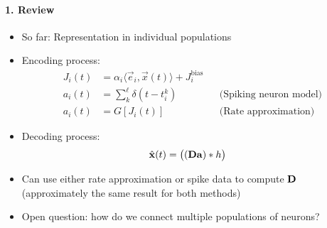 \documentclass[10pt,letterpaper,oneside]{article}
\begin{document}
\paragraph{1. Review}
\begin{itemize}
	\item So far: Representation in individual populations
	\item Encoding process:
	\begin{align*}
		J_i(t) &= \alpha_i \langle \vec e_i, \vec x(t) \rangle + J_i^\mathrm{bias} \\
		a_i(t) &= \sum_k^\ell \delta(t - t_i^k) && \text{(Spiking neuron model)} \\
		a_i(t) &= G[J_i(t)] && \text{(Rate approximation)}
	\end{align*}
	\item Decoding process:
	\begin{align*}
		\hat{{\mathbf{x}}}(t) &= \big( ({\mathbf{D}} {\mathbf{a}}) \ast h \big)
	\end{align*}
	\item Can use either rate approximation or spike data to compute ${\mathbf{D}}$ (approximately the same result for both methods)
	\item Open question: how do we connect multiple populations of neurons?
\end{itemize}
\end{document}
